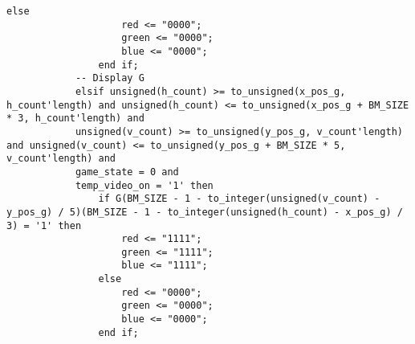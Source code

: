 \documentclass{article}
\begin{document}
\begin{lstlisting}[caption=Draw Process, label=lst:draw-process]
                else
                    red <= "0000";
                    green <= "0000";
                    blue <= "0000";
                end if;
            -- Display G
            elsif unsigned(h_count) >= to_unsigned(x_pos_g, h_count'length) and unsigned(h_count) <= to_unsigned(x_pos_g + BM_SIZE * 3, h_count'length) and
            unsigned(v_count) >= to_unsigned(y_pos_g, v_count'length) and unsigned(v_count) <= to_unsigned(y_pos_g + BM_SIZE * 5, v_count'length) and
            game_state = 0 and
            temp_video_on = '1' then
                if G(BM_SIZE - 1 - to_integer(unsigned(v_count) - y_pos_g) / 5)(BM_SIZE - 1 - to_integer(unsigned(h_count) - x_pos_g) / 3) = '1' then
                    red <= "1111";
                    green <= "1111";
                    blue <= "1111";
                else
                    red <= "0000";
                    green <= "0000";
                    blue <= "0000";
                end if;


\end{lstlisting}
\end{document}
